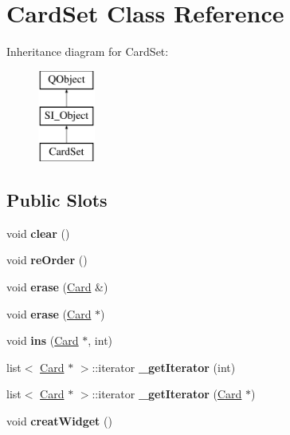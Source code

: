 \hypertarget{class_card_set}{}\section{Card\+Set Class Reference}
\label{class_card_set}
Inheritance diagram for Card\+Set\+:\begin{figure}[H]
\begin{center}
\leavevmode
\includegraphics[height=3.000000cm]{class_card_set}
\end{center}
\end{figure}
\subsection*{Public Slots}
\begin{DoxyCompactItemize}
\item 
\mbox{\label{class_card_set_aceb4ca4e4afc86a9e023d9fe8d4e4779}} 
void {\bfseries clear} ()
\item 
\mbox{\label{class_card_set_ae0800ef1090156cc46b19fec949fe91f}} 
void {\bfseries re\+Order} ()
\item 
\mbox{\label{class_card_set_a8b7912316916ea6c69f151ecfdbcddb9}} 
void {\bfseries erase} (\hyperlink{class_card}{Card} \&)
\item 
\mbox{\label{class_card_set_a8dc3d979e356f0d97ebea17a1b8fc539}} 
void {\bfseries erase} (\hyperlink{class_card}{Card} $\ast$)
\item 
\mbox{\label{class_card_set_a5e61777b1d1eb2ca933ef5c16eb0e945}} 
void {\bfseries ins} (\hyperlink{class_card}{Card} $\ast$, int)
\item 
\mbox{\label{class_card_set_ae2da9ca0de5572e3d045b61233b3c134}} 
list$<$ \hyperlink{class_card}{Card} $\ast$ $>$\+::iterator {\bfseries \+\_\+get\+Iterator} (int)
\item 
\mbox{\label{class_card_set_a8fbebc315fd5f9fd62e3f0ae081883e2}} 
list$<$ \hyperlink{class_card}{Card} $\ast$ $>$\+::iterator {\bfseries \+\_\+get\+Iterator} (\hyperlink{class_card}{Card} $\ast$)
\item 
\mbox{\label{class_card_set_adab44fa0a7e9254f74e9b7778522197d}} 
void {\bfseries creat\+Widget} ()
\end{DoxyCompactItemize}
